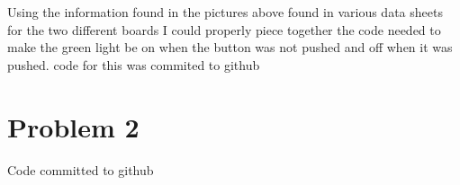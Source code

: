 \documentclass{article}
\begin{document}
\begin{center}
    \bigbreak
    Using the information found in the pictures above found in various data sheets for the two different boards I could properly piece together the code needed to make the green light be on when the button was not pushed and off when it was pushed. code for this was commited to github
\end{center}
\section*{Problem 2}
\begin{center}
    Code committed to github
\end{center}
\end{document}
